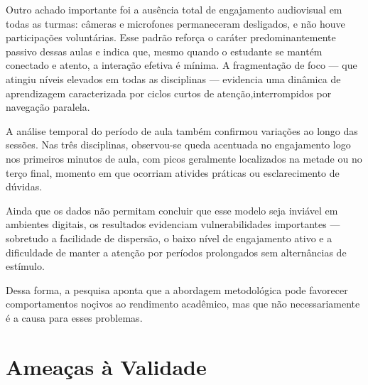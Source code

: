 Outro achado importante foi a ausência total de engajamento audiovisual em todas as turmas: câmeras e microfones permaneceram desligados, e não houve participações voluntárias. Esse padrão reforça o caráter predominantemente passivo dessas aulas e indica que, mesmo quando o estudante se mantém conectado e atento, a interação efetiva é mínima. A fragmentação de foco --- que atingiu níveis elevados em todas as disciplinas --- evidencia uma dinâmica de aprendizagem caracterizada por ciclos curtos de atenção,interrompidos por navegação paralela.

A análise temporal do período de aula também confirmou variações ao longo das sessões. Nas três disciplinas, observou-se queda acentuada no engajamento logo nos primeiros minutos de aula, com picos geralmente localizados na metade ou no terço final, momento em que ocorriam ativides práticas ou esclarecimento de dúvidas.

Ainda que os dados não permitam concluir que esse modelo seja inviável em ambientes digitais, os resultados evidenciam vulnerabilidades importantes --- sobretudo a facilidade de dispersão, o baixo nível de engajamento ativo e a dificuldade de manter a atenção por períodos prolongados sem alternâncias de estímulo.

Dessa forma, a pesquisa aponta que a abordagem metodológica pode favorecer comportamentos noçivos ao rendimento acadêmico, mas que não necessariamente é a causa para esses problemas.

\section{Ameaças à Validade}\label{sec:validation_threat}

